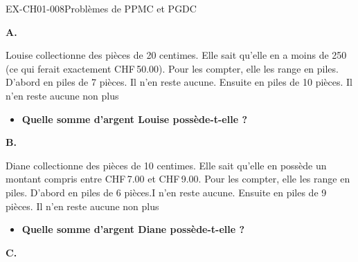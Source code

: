
\begin{exercice}{EX-CH01-008}{Problèmes de PPMC et PGDC}

\bigskip\textbf{A.}

\medskip
Louise collectionne des pièces de 20 centimes. Elle sait qu'elle en a moins de 250 (ce qui ferait exactement CHF\,50.00). Pour les compter, elle les range en piles. D'abord en piles de 7 pièces. Il n'en reste aucune. Ensuite en piles de 10 pièces. Il n'en reste aucune non plus

\begin{itemize}[label=$\blacktriangleright$]
\item \textbf{Quelle somme d'argent Louise possède-t-elle ?}
\end{itemize}


\bigskip\textbf{B.}

\medskip
Diane collectionne des pièces de 10 centimes. Elle sait qu'elle en possède un montant compris entre CHF\,7.00 et CHF\,9.00. Pour les compter, elle les range en piles. D'abord en piles de 6 pièces.I n'en reste aucune. Ensuite en piles de 9 pièces. Il n'en reste aucune non plus

\begin{itemize}[label=$\blacktriangleright$]
\item \textbf{Quelle somme d'argent Diane possède-t-elle ?}
\end{itemize}

\bigskip\textbf{C.}


\end{exercice}
